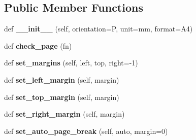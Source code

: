 \subsection*{Public Member Functions}
\begin{DoxyCompactItemize}
\item 
def {\bfseries \+\_\+\+\_\+init\+\_\+\+\_\+} (self, orientation=\textquotesingle{}P\textquotesingle{}, unit=\textquotesingle{}mm\textquotesingle{}, format=\textquotesingle{}A4\textquotesingle{})\hypertarget{class_libraries_1_1fpdf_1_1fpdf_1_1_f_p_d_f_a9afa81c650c2cb8efde29173f9a1ac86}{}\label{class_libraries_1_1fpdf_1_1fpdf_1_1_f_p_d_f_a9afa81c650c2cb8efde29173f9a1ac86}

\item 
def {\bfseries check\+\_\+page} (fn)\hypertarget{class_libraries_1_1fpdf_1_1fpdf_1_1_f_p_d_f_a2b4021d2b2e24c75a0a16be131aa3de9}{}\label{class_libraries_1_1fpdf_1_1fpdf_1_1_f_p_d_f_a2b4021d2b2e24c75a0a16be131aa3de9}

\item 
def {\bfseries set\+\_\+margins} (self, left, top, right=-\/1)\hypertarget{class_libraries_1_1fpdf_1_1fpdf_1_1_f_p_d_f_a4cef827ab84e755e28b6a410e83c3988}{}\label{class_libraries_1_1fpdf_1_1fpdf_1_1_f_p_d_f_a4cef827ab84e755e28b6a410e83c3988}

\item 
def {\bfseries set\+\_\+left\+\_\+margin} (self, margin)\hypertarget{class_libraries_1_1fpdf_1_1fpdf_1_1_f_p_d_f_a6f886cb82f2a034ef892c2b7cd2ceea9}{}\label{class_libraries_1_1fpdf_1_1fpdf_1_1_f_p_d_f_a6f886cb82f2a034ef892c2b7cd2ceea9}

\item 
def {\bfseries set\+\_\+top\+\_\+margin} (self, margin)\hypertarget{class_libraries_1_1fpdf_1_1fpdf_1_1_f_p_d_f_a4fa6870cc1baa3e5977464255192e82b}{}\label{class_libraries_1_1fpdf_1_1fpdf_1_1_f_p_d_f_a4fa6870cc1baa3e5977464255192e82b}

\item 
def {\bfseries set\+\_\+right\+\_\+margin} (self, margin)\hypertarget{class_libraries_1_1fpdf_1_1fpdf_1_1_f_p_d_f_ae179d257bb0409b77d44be7abff9a315}{}\label{class_libraries_1_1fpdf_1_1fpdf_1_1_f_p_d_f_ae179d257bb0409b77d44be7abff9a315}

\item 
def {\bfseries set\+\_\+auto\+\_\+page\+\_\+break} (self, auto, margin=0)\hypertarget{class_libraries_1_1fpdf_1_1fpdf_1_1_f_p_d_f_aac8afeadc1e00c7403c7e842433121ff}{}\label{class_libraries_1_1fpdf_1_1fpdf_1_1_f_p_d_f_aac8afeadc1e00c7403c7e842433121ff}


\end{DoxyCompactItemize}
